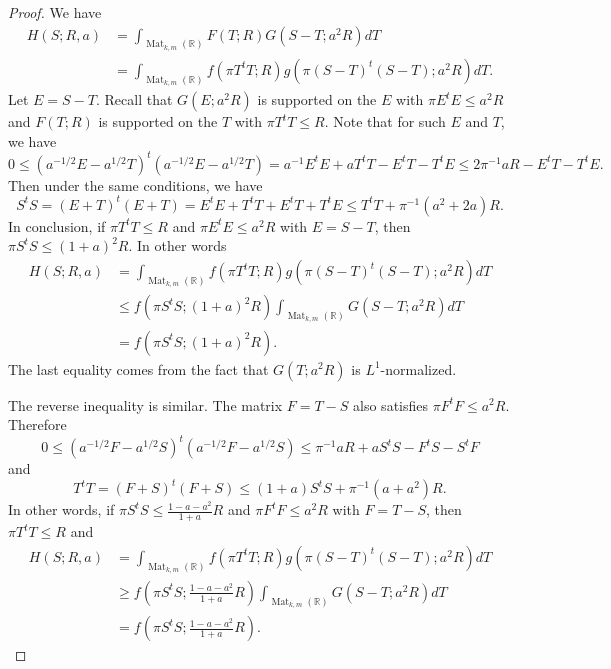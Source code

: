 \documentclass[10pt,a4paper]{amsart}
\DeclareMathOperator{\Mat}{Mat}
\newcommand{\RR}{\mathbb R}
\begin{document}
\begin{proof}
We have
\begin{align*}
H(S;R,a)&=\int_{\Mat_{k,m}(\RR)}F(T;R)G(S-T;a^2R)dT\\
	&=\int_{\Mat_{k,m}(\RR)}f(\pi T^tT;R)g(\pi(S-T)^t(S-T);a^2R)dT.
\end{align*}
Let $E=S-T$. Recall that $G(E;a^2R)$ is supported on the $E$ with $\pi E^tE\leq a^2R$ and $F(T;R)$ is supported on the $T$ with $\pi T^tT\leq R$. Note that for such $E$ and $T$, we have
$$0\leq(a^{-1/2}E-a^{1/2}T)^t(a^{-1/2}E-a^{1/2}T)=a^{-1}E^tE+aT^tT-E^tT-T^tE\leq2\pi^{-1}aR-E^tT-T^tE.$$
Then under the same conditions, we have
$$S^tS=(E+T)^t(E+T)=E^tE+T^tT+E^tT+T^tE\leq T^tT+\pi^{-1}(a^2+2a)R.$$
In conclusion, if $\pi T^tT\leq R$ and $\pi E^tE\leq a^2R$ with $E=S-T$, then $\pi S^tS\leq(1+a)^2R$. In other words
\begin{align*}
H(S;R,a)&=\int_{\Mat_{k,m}(\RR)}f(\pi T^tT;R)g(\pi(S-T)^t(S-T);a^2R)dT\\
	&\leq f(\pi S^tS;(1+a)^2R)\int_{\Mat_{k,m}(\RR)}G(S-T;a^2R)dT\\
	&=f(\pi S^tS;(1+a)^2R).
\end{align*}
The last equality comes from the fact that $G(T;a^2R)$ is $L^1$-normalized.

The reverse inequality is similar. The matrix $F=T-S$ also satisfies $\pi F^tF\leq a^2R$. Therefore
$$0\leq(a^{-1/2}F-a^{1/2}S)^t(a^{-1/2}F-a^{1/2}S)\leq\pi^{-1}aR+aS^tS-F^tS-S^tF$$
and
$$T^tT=(F+S)^t(F+S)\leq(1+a)S^tS+\pi^{-1}(a+a^2)R.$$
In other words, if $\pi S^tS\leq\frac{1-a-a^2}{1+a}R$ and $\pi F^tF\leq a^2R$ with $F=T-S$, then $\pi T^tT\leq R$ and
\begin{align*}
H(S;R,a)&=\int_{\Mat_{k,m}(\RR)}f(\pi T^tT;R)g(\pi(S-T)^t(S-T);a^2R)dT\\
	&\geq f\left(\pi S^tS;\frac{1-a-a^2}{1+a}R\right)\int_{\Mat_{k,m}(\RR)}G(S-T;a^2R)dT\\
	&=f\left(\pi S^tS;\frac{1-a-a^2}{1+a}R\right).
\end{align*}
\end{proof}
\end{document}
